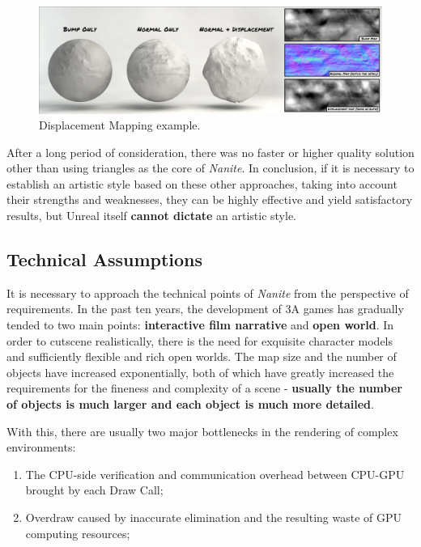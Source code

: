 \documentclass[10pt,journal,compsoc]{IEEEtran}
\begin{document}
\begin{figure}[H]
    \centering
    \includegraphics[scale=0.18]{img/displacement.png}
    \caption{Displacement Mapping example\cite{disp}.}
    \label{fig:displacement}
\end{figure}

After a long period of consideration, there was no faster or higher quality solution other than using triangles as the core of \textit{Nanite}. In conclusion, if it is necessary to establish an artistic style based on these other approaches, taking into account their strengths and weaknesses, they can be highly effective and yield satisfactory results, but Unreal itself \textbf{cannot dictate} an artistic style.

\subsection{Technical Assumptions}

\par It is necessary to approach the technical points of \textit{Nanite} from the perspective of requirements. In the past ten years, the development of 3A games has gradually tended to two main points: \textbf{interactive film narrative} and \textbf{open world}. In order to cutscene realistically, there is the need for exquisite character models and sufficiently flexible and rich open worlds. The map size and the number of objects have increased exponentially, both of which have greatly increased the requirements for the fineness and complexity of a scene - \textbf{usually the number of objects is much larger and each object is much more detailed}.
 
\par With this, there are usually two major bottlenecks in the rendering of complex environments:

\begin{enumerate}
    \item The CPU-side verification and communication overhead between CPU-GPU brought by each Draw Call;
    \item Overdraw caused by inaccurate elimination and the resulting waste of GPU computing resources;
\end{enumerate}
\end{document}
